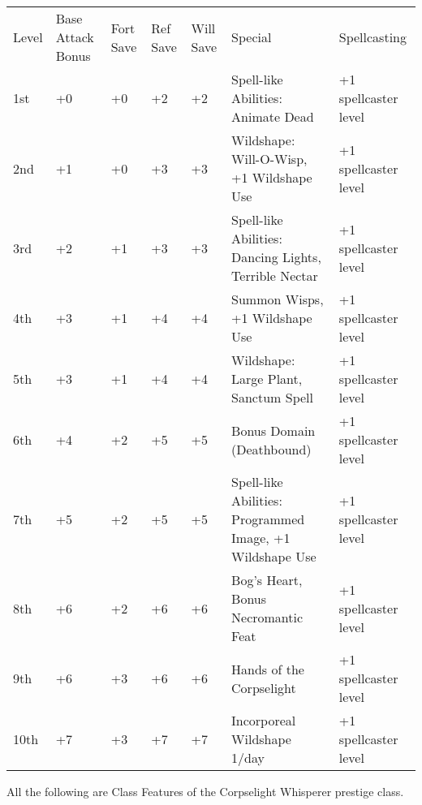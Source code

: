 \begin{table}[tbh]
\begin{small}
\begin{tabular}{lp{1.9cm}p{0.7cm}p{0.7cm}p{0.7cm}p{7cm}l}
Level  &Base Attack Bonus &Fort Save &Ref Save &Will Save &Special &Spellcasting\\
1st &+0 &+0 &+2 &+2 &Spell-like Abilities: Animate Dead &+1 spellcaster level\\
2nd &+1 &+0 &+3 &+3 &Wildshape: Will-O-Wisp, +1 Wildshape Use &+1 spellcaster level\\
3rd &+2 &+1 &+3 &+3 &Spell-like Abilities: Dancing Lights, Terrible Nectar &+1 spellcaster level\\
4th &+3 &+1 &+4 &+4 &Summon Wisps, +1 Wildshape Use &+1 spellcaster level\\
5th &+3 &+1 &+4 &+4 &Wildshape: Large Plant, Sanctum Spell &+1 spellcaster level\\
6th &+4 &+2 &+5 &+5 &Bonus Domain (Deathbound) &+1 spellcaster level\\
7th &+5 &+2 &+5 &+5 &Spell-like Abilities: Programmed Image, +1 Wildshape Use &+1 spellcaster level\\
8th &+6 &+2 &+6 &+6 &Bog's Heart, Bonus Necromantic Feat &+1 spellcaster level\\
9th &+6 &+3 &+6 &+6 &Hands of the Corpselight &+1 spellcaster level\\
10th &+7 &+3 &+7 &+7 &Incorporeal Wildshape 1/day &+1 spellcaster level\\
\end{tabular}
\end{small}
\end{table}

\smallskip \noindent All the following are Class Features of the Corpselight Whisperer prestige class.




